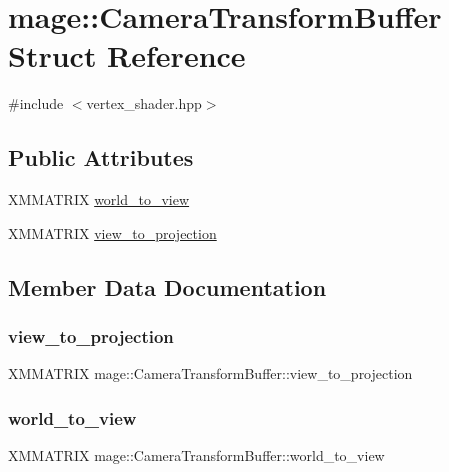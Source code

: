 \hypertarget{structmage_1_1_camera_transform_buffer}{}\section{mage\+:\+:Camera\+Transform\+Buffer Struct Reference}
\label{structmage_1_1_camera_transform_buffer}


{\ttfamily \#include $<$vertex\+\_\+shader.\+hpp$>$}

\subsection*{Public Attributes}
\begin{DoxyCompactItemize}
\item 
X\+M\+M\+A\+T\+R\+IX \hyperlink{structmage_1_1_camera_transform_buffer_acf0f9265ffe93c9203993bf573811364}{world\+\_\+to\+\_\+view}
\item 
X\+M\+M\+A\+T\+R\+IX \hyperlink{structmage_1_1_camera_transform_buffer_a87d9c65862cb29bbf0b3555b1d990bbe}{view\+\_\+to\+\_\+projection}
\end{DoxyCompactItemize}


\subsection{Member Data Documentation}
\hypertarget{structmage_1_1_camera_transform_buffer_a87d9c65862cb29bbf0b3555b1d990bbe}{}\label{structmage_1_1_camera_transform_buffer_a87d9c65862cb29bbf0b3555b1d990bbe} 
\subsubsection{\texorpdfstring{view\+\_\+to\+\_\+projection}{view\_to\_projection}}
{\footnotesize\ttfamily X\+M\+M\+A\+T\+R\+IX mage\+::\+Camera\+Transform\+Buffer\+::view\+\_\+to\+\_\+projection}

\hypertarget{structmage_1_1_camera_transform_buffer_acf0f9265ffe93c9203993bf573811364}{}\label{structmage_1_1_camera_transform_buffer_acf0f9265ffe93c9203993bf573811364} 
\subsubsection{\texorpdfstring{world\+\_\+to\+\_\+view}{world\_to\_view}}
{\footnotesize\ttfamily X\+M\+M\+A\+T\+R\+IX mage\+::\+Camera\+Transform\+Buffer\+::world\+\_\+to\+\_\+view}

